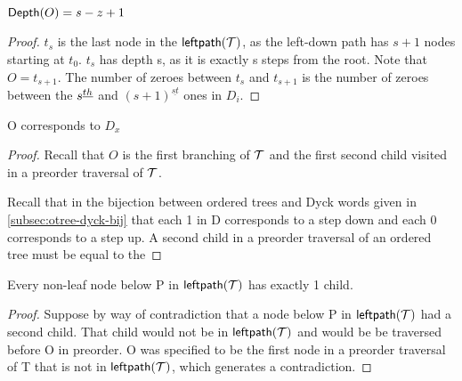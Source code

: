 \begin{remark} $\mathsf{Depth}{(O)}=s-z+1$ \label{re:o_depth_formula}
\end{remark} 
\begin{proof}


    $t_s$ is the last node in the $\mathsf{leftpath}{(\mathcal{T})}$, as the left-down path has $s+1$ nodes starting at $t_0$. $t_s$ has depth s, as it is exactly s steps from the root.  Note that $O=t_{s+1}$.  The number of zeroes between $t_s$ and $t_{s+1}$ is the number of zeroes between the $s^{\underline{th}}$ and $(s+1)^{\underline{st}}$ ones in $D_i$.  

\end{proof} 
\begin{remark}O corresponds to $D_x$%
\end{remark}
\begin{proof}
    Recall that $O$ is the first branching of $\mathcal{T}$ and the first second child visited in a preorder traversal of $\mathcal{T}$.

    Recall that in the bijection between ordered trees and Dyck words given in \ref{subsec:otree-dyck-bij} that each 1 in D corresponds to a step down and each 0 corresponds to a step up.  A second child in a preorder traversal of an ordered tree must be equal to the 

\end{proof}
\begin{remark} Every non-leaf node below P in $\mathsf{leftpath}{(\mathcal{T})}$ has exactly 1 child.  \label{rem:left-is-path}
\end{remark}

\begin{proof}
    Suppose by way of contradiction that a node below P in $\mathsf{leftpath}{(\mathcal{T})}$ had a second child. That child would not be in $\mathsf{leftpath}{(\mathcal{T})}$ and would be be traversed before O in preorder. O was specified to be the first node in a preorder traversal of T that is not in $\mathsf{leftpath}{(\mathcal{T})}$, which generates a contradiction.

\end{proof}

